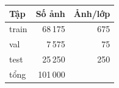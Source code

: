 \begin{tabular}{lrr}
\toprule
Tập & Số ảnh & Ảnh/lớp \\
\midrule
train & 68\,175 & 675 \\
val & 7\,575 & 75 \\
test & 25\,250 & 250 \\
\midrule
tổng & 101\,000 & \\
\bottomrule
\end{tabular}
